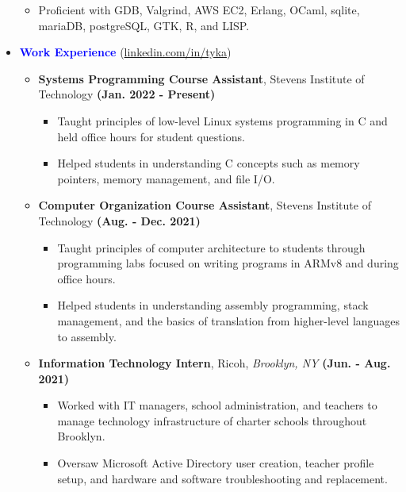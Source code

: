 \documentclass[11pt]{article}
\begin{document}
\begin{flushleft}
\begin{itemize}
\begin{itemize}
            \item Proficient with GDB, Valgrind, AWS EC2, Erlang, OCaml, sqlite, mariaDB, postgreSQL, GTK, R, and LISP.
        \end{itemize}
    \item[] \Large \textcolor{blue}{\textbf{Work Experience}} (\href{https://linkedin.com/in/tyka}{linkedin.com/in/tyka}) \normalsize
        \begin{itemize}
            \item \textbf{Systems Programming Course Assistant}, Stevens Institute of Technology \hfill{\textbf{(Jan. 2022 - Present)}}
                \begin{itemize}
                    \item Taught principles of low-level Linux systems programming in C and held office hours for student questions.
                    \item Helped students in understanding C concepts such as memory pointers, memory management, and file I/O.
                \end{itemize}
            \item \textbf{Computer Organization Course Assistant}, Stevens Institute of Technology \hfill{\textbf{(Aug. - Dec. 2021)}}
                \begin{itemize}
                    \item Taught principles of computer architecture to students through programming labs focused on writing programs in ARMv8 and during office hours.
                    \item Helped students in understanding assembly programming, stack management, and the basics of translation from higher-level languages to assembly.
                \end{itemize}
            \item \textbf{Information Technology Intern}, Ricoh, \textit{Brooklyn, NY} \hfill{\textbf{(Jun. - Aug. 2021)}}
                \begin{itemize}
                    \item Worked with IT managers, school administration, and teachers to manage technology infrastructure of charter schools throughout Brooklyn.
                    \item Oversaw Microsoft Active Directory user creation, teacher profile setup, and hardware and software troubleshooting and replacement.
                \end{itemize}
        \end{itemize}

\end{itemize}
\end{flushleft}
\end{document}

